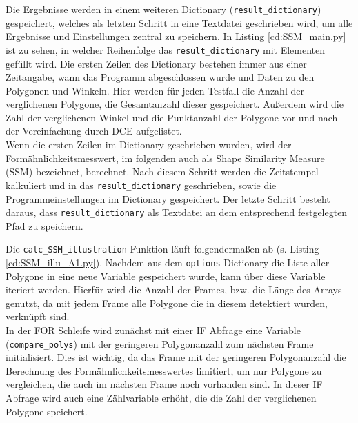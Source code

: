 {	Die Ergebnisse werden in einem weiteren Dictionary (\lstinline|result_dictionary|) gespeichert, welches als letzten Schritt in eine Textdatei geschrieben wird, um alle Ergebnisse und Einstellungen zentral zu speichern. \ifimportant In Listing \ref{cd:SSM_main.py} ist zu sehen, in welcher Reihenfolge das \lstinline|result_dictionary| mit Elementen gefüllt wird. \fi Die ersten Zeilen des Dictionary bestehen immer aus einer Zeitangabe, wann das Programm abgeschlossen wurde und Daten zu den Polygonen und Winkeln. Hier werden für jeden Testfall die Anzahl der verglichenen Polygone, die Gesamtanzahl dieser gespeichert. Außerdem wird die Zahl der verglichenen Winkel und die Punktanzahl der Polygone vor und nach der Vereinfachung durch DCE aufgelistet. \\
	Wenn die ersten Zeilen im Dictionary geschrieben wurden, wird der Formähnlichkeitsmesswert, im folgenden auch als \glqq Shape Similarity Measure\grqq{} (SSM) bezeichnet, berechnet. Nach diesem Schritt werden die Zeitstempel kalkuliert und in das \lstinline|result_dictionary| geschrieben, sowie die Programmeinstellungen im Dictionary gespeichert. Der letzte Schritt besteht daraus, dass \lstinline|result_dictionary| als Textdatei an dem entsprechend festgelegten Pfad zu speichern.
	\ifimportant
	 
	\fi
	Die \lstinline|calc_SSM_illustration| Funktion läuft folgendermaßen ab \ifimportant(s. Listing \ref{cd:SSM_illu_A1.py})\fi. Nachdem aus dem \lstinline|options| Dictionary die Liste aller Polygone in eine neue Variable gespeichert wurde, kann über diese Variable iteriert werden. Hierfür wird die Anzahl der Frames, bzw. die Länge des Arrays genutzt, da mit jedem Frame alle Polygone die in diesem detektiert wurden, verknüpft sind. \\
	In der FOR Schleife wird zunächst mit einer IF Abfrage eine Variable (\lstinline|compare_polys|) mit der geringeren Polygonanzahl zum nächsten Frame initialisiert. Dies ist wichtig, da das Frame mit der geringeren Polygonanzahl die Berechnung des Formähnlichkeitsmesswertes limitiert, um nur Polygone zu vergleichen, die auch im nächsten Frame noch vorhanden sind. In dieser IF Abfrage wird auch eine Zählvariable erhöht, die die Zahl der verglichenen Polygone speichert. \\

	\ifimportant
	
	\fi

}

